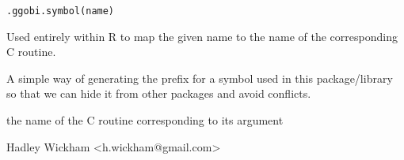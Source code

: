 \begin{Description}\relax
\end{Description}
\begin{Usage}
\begin{verbatim}.ggobi.symbol(name)\end{verbatim}
\end{Usage}
\begin{Arguments}
\begin{ldescription}
\item[\code{name}] 
\end{ldescription}
\end{Arguments}
\begin{Details}\relax
Used entirely within R to map the given name to the name of the
corresponding C routine.

A simple way of generating the prefix for a symbol
used in this package/library so that we can hide
it from other packages and avoid conflicts.
\end{Details}
\begin{Value}
the name of the C routine corresponding to its argument
\end{Value}
\begin{Author}\relax
Hadley Wickham <h.wickham@gmail.com>
\end{Author}
\begin{Examples}
\begin{ExampleCode}\end{ExampleCode}
\end{Examples}

